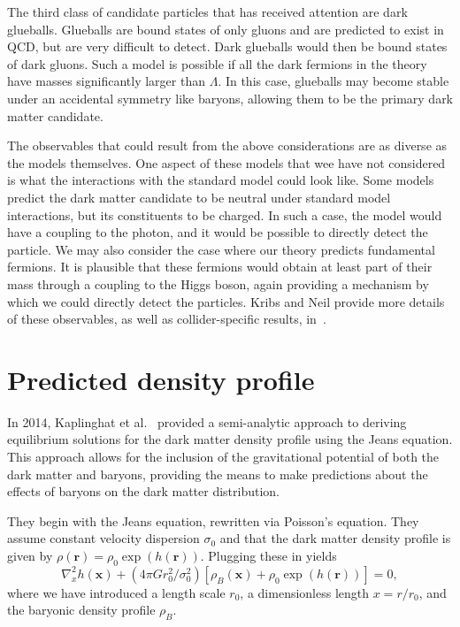 The third class of candidate particles that has received attention are dark
glueballs. Glueballs are bound states of only gluons and are predicted to
exist in QCD, but are very difficult to detect. Dark glueballs would then be
bound states of dark gluons. Such a model is possible if all the dark fermions
in the theory have masses significantly larger than \(\Lambda\). In this case,
glueballs may become stable under an accidental symmetry like baryons,
allowing them to be the primary dark matter candidate.

The observables that could result from the above considerations are as diverse
as the models themselves. One aspect of these models that wee have not
considered is what the interactions with the standard model could look like.
Some models predict the dark matter candidate to be neutral under standard
model interactions, but its constituents to be charged. In such a case, the
model would have a coupling to the photon, and it would be possible to
directly detect the particle. We may also consider the case where our theory
predicts fundamental fermions. It is plausible that these fermions would
obtain at least part of their mass through a coupling to the Higgs boson,
again providing a mechanism by which we could directly detect the particles.
Kribs and Neil provide more details of these observables, as well as
collider-specific results, in~\cite{kribs_review_2016}.

\hypertarget{predicted-density-profile}{%
\section{Predicted density profile}\label{predicted-density-profile}}

In 2014, Kaplinghat et al.~\cite{kaplinghat_tying_2014} provided a
semi-analytic approach to deriving equilibrium solutions for the dark matter
density profile using the Jeans equation. This approach allows for the
inclusion of the gravitational potential of both the dark matter and baryons,
providing the means to make predictions about the effects of baryons on the
dark matter distribution.

They begin with the Jeans equation, rewritten via Poisson's equation.
They assume constant velocity dispersion \(\sigma_0\) and that the dark
matter density profile is given by
\(\rho(\mathbf{r}) = \rho_0 \exp(h(\mathbf{r}))\). Plugging these in
yields
\begin{equation}
\nabla_x^2 h(\mathbf{x}) + (4\pi G r_0^2/\sigma_0^2)
\left[\rho_B(\mathbf{x}) + \rho_0 \exp\left(h(\mathbf{r})\right)\right] = 0,
\end{equation}
where we have introduced a length scale \(r_0\), a dimensionless length
\(x = r / r_0\), and the baryonic density profile \(\rho_B\).

